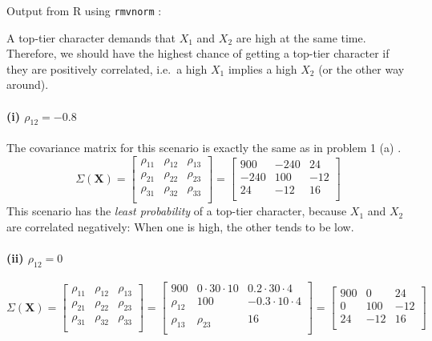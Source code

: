 \documentclass[a4paper,english,12pt]{article}
\begin{document}
Output from R using \texttt{rmvnorm} \cite{mvtnorm}:

A top-tier character demands that  $X_1$ and $X_2$ are high at the
same time. Therefore, we should have the highest chance of getting a top-tier
character if they are positively correlated, i.e.~a high $X_1$ implies a high
$X_2$ (or the other way around).

\paragraph{(i)   $\rho_{12} =  -0.8$}
The covariance matrix for this scenario is exactly the same as in problem 1 (a)
.
\[
  \Sigma\left(\textbf{X}\right) =
    \begin{bmatrix}
      \rho_{11} & \rho_{12} & \rho_{13} \\
      \rho_{21} & \rho_{22} & \rho_{23} \\
      \rho_{31} & \rho_{32} & \rho_{33} \\
    \end{bmatrix}
  =
    \begin{bmatrix}
       900 & -240 &  24 \\
      -240 &  100 & -12 \\
        24 &  -12 &  16 \\
    \end{bmatrix}
\]
This scenario has the \textit{least probability} of a top-tier character,
because $X_1$ and $X_2$ are correlated negatively: When one is high, the other
tends to be low.

\paragraph{(ii)  $\rho_{12} =   0$}
\[
  \Sigma\left(\textbf{X}\right) =
    \begin{bmatrix}
      \rho_{11} & \rho_{12} & \rho_{13} \\
      \rho_{21} & \rho_{22} & \rho_{23} \\
      \rho_{31} & \rho_{32} & \rho_{33} \\
    \end{bmatrix}
  =
    \begin{bmatrix}
      900       & 0 \cdot 30 \cdot 10 & 0.2 \cdot 30 \cdot 4 \\
      \rho_{12} & 100                    & -0.3 \cdot 10 \cdot 4 \\
      \rho_{13} & \rho_{23}              & 16 \\
    \end{bmatrix}
  =
    \begin{bmatrix}
      900       & 0                      & 24 \\
        0       & 100                    & -12 \\
       24       & -12                    & 16 \\
    \end{bmatrix}
\]
\end{document}
